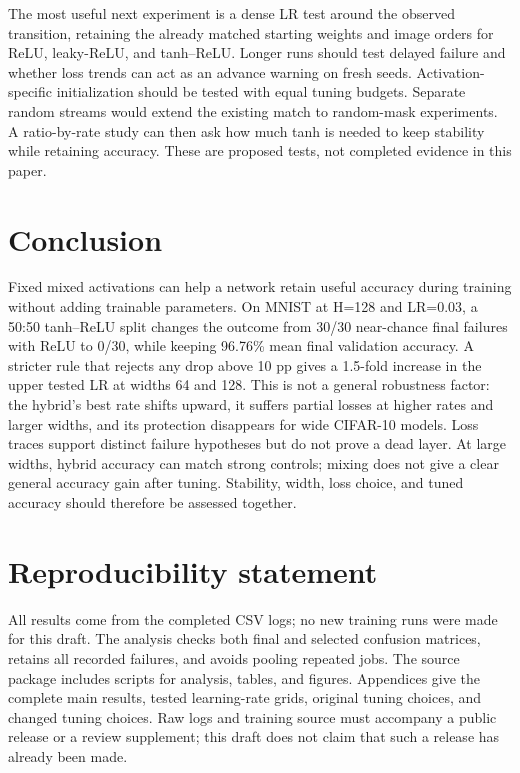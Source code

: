 \documentclass[10pt]{article}
\begin{document}
The most useful next experiment is a dense LR test around the observed transition, retaining the already matched starting weights and image orders for ReLU, leaky-ReLU, and tanh--ReLU. Longer runs should test delayed failure and whether loss trends can act as an advance warning on fresh seeds. Activation-specific initialization should be tested with equal tuning budgets. Separate random streams would extend the existing match to random-mask experiments. A ratio-by-rate study can then ask how much tanh is needed to keep stability while retaining accuracy. These are proposed tests, not completed evidence in this paper.

\section{Conclusion}
Fixed mixed activations can help a network retain useful accuracy during training without adding trainable parameters. On MNIST at H=128 and LR=0.03, a 50:50 tanh--ReLU split changes the outcome from 30/30 near-chance final failures with ReLU to 0/30, while keeping 96.76\% mean final validation accuracy. A stricter rule that rejects any drop above 10 pp gives a 1.5-fold increase in the upper tested LR at widths 64 and 128. This is not a general robustness factor: the hybrid's best rate shifts upward, it suffers partial losses at higher rates and larger widths, and its protection disappears for wide CIFAR-10 models. Loss traces support distinct failure hypotheses but do not prove a dead layer. At large widths, hybrid accuracy can match strong controls; mixing does not give a clear general accuracy gain after tuning. Stability, width, loss choice, and tuned accuracy should therefore be assessed together.

\section*{Reproducibility statement}
All results come from the completed CSV logs; no new training runs were made for this draft. The analysis checks both final and selected confusion matrices, retains all recorded failures, and avoids pooling repeated jobs. The source package includes scripts for analysis, tables, and figures. Appendices give the complete main results, tested learning-rate grids, original tuning choices, and changed tuning choices. Raw logs and training source must accompany a public release or a review supplement; this draft does not claim that such a release has already been made.
\end{document}
